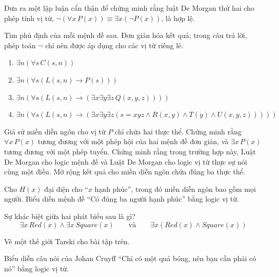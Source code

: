 \begin{exercise}
Đưa ra một lập luận cẩn thận để chứng minh rằng luật De Morgan thứ hai cho phép tính vị từ, $\neg(\forall x\, P(x)) \equiv \exists x(\neg P(x))$, là hợp lệ.
\end{exercise}

\begin{exercise}
Tìm phủ định của mỗi mệnh đề sau. Đơn giản hóa kết quả; trong câu trả lời, phép toán $\neg$ chỉ nên được áp dụng cho các vị từ riêng lẻ.
\begin{enumerate}[label=\alph*)]
\item $\exists n(\forall s\, C(s,n))$
\item $\exists n(\forall s(L(s,n) \to P(s)))$
\item $\exists n(\forall s(L(s,n) \to (\exists x \exists y \exists z\, Q(x,y,z))))$
\item $\exists n(\forall s(L(s,n) \to (\exists x \exists y \exists z(s = xyz \land R(x,y) \land T(y) \land U(x,y,z)))))$
\end{enumerate}
\end{exercise}

\begin{exercise}
Giả sử miền diễn ngôn cho vị từ $P$ chỉ chứa hai thực thể. Chứng minh rằng $\forall x\, P(x)$ tương đương với một phép hội của hai mệnh đề đơn giản, và $\exists x\, P(x)$ tương đương với một phép tuyển. Chứng minh rằng trong trường hợp này, Luật De Morgan cho logic mệnh đề và Luật De Morgan cho logic vị từ thực sự nói cùng một điều. Mở rộng kết quả cho miền diễn ngôn chứa đúng ba thực thể.
\end{exercise}

\begin{exercise}
Cho $H(x)$ đại diện cho ``$x$ hạnh phúc'', trong đó miền diễn ngôn bao gồm mọi người. Biểu diễn mệnh đề ``Có đúng ba người hạnh phúc'' bằng logic vị từ.
\end{exercise}

\begin{exercise}
Sự khác biệt giữa hai phát biểu sau là gì?
\[\exists x\, Red(x) \land \exists x\, Square(x) \qquad \text{và} \qquad \exists x(Red(x) \land Square(x))\]
\end{exercise}

\begin{exercise}
Vẽ một thế giới Tarski cho bài tập trên.
\end{exercise}

\begin{exercise}
Biểu diễn câu nói của Johan Cruyff ``Chỉ có một quả bóng, nên bạn cần phải có nó'' bằng logic vị từ.
\end{exercise}

